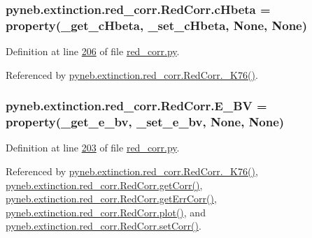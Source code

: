 \begin{DoxyVerb}
\subsubsection[{c\+Hbeta}]{\setlength{\rightskip}{0pt plus 5cm}pyneb.\+extinction.\+red\+\_\+corr.\+Red\+Corr.\+c\+Hbeta = property({\bf \+\_\+get\+\_\+c\+Hbeta}, {\bf \+\_\+set\+\_\+c\+Hbeta}, None, None)\hspace{0.3cm}{\ttfamily [static]}}\label{classpyneb_1_1extinction_1_1red__corr_1_1_red_corr_aaf16ae2a0bdb5dd620f9db382ffeebc9}


Definition at line \hyperlink{red__corr_8py_source_l00206}{206} of file \hyperlink{red__corr_8py_source}{red\+\_\+corr.\+py}.



Referenced by \hyperlink{red__corr_8py_source_l00595}{pyneb.\+extinction.\+red\+\_\+corr.\+Red\+Corr.\+\_\+\+K76()}.

\hypertarget{classpyneb_1_1extinction_1_1red__corr_1_1_red_corr_a0bc581bcaa8eeeb67b83ffdec58bf164}{}
\subsubsection[{E\+\_\+\+B\+V}]{\setlength{\rightskip}{0pt plus 5cm}pyneb.\+extinction.\+red\+\_\+corr.\+Red\+Corr.\+E\+\_\+\+B\+V = property({\bf \+\_\+get\+\_\+e\+\_\+bv}, {\bf \+\_\+set\+\_\+e\+\_\+bv}, None, None)\hspace{0.3cm}{\ttfamily [static]}}\label{classpyneb_1_1extinction_1_1red__corr_1_1_red_corr_a0bc581bcaa8eeeb67b83ffdec58bf164}


Definition at line \hyperlink{red__corr_8py_source_l00203}{203} of file \hyperlink{red__corr_8py_source}{red\+\_\+corr.\+py}.



Referenced by \hyperlink{red__corr_8py_source_l00595}{pyneb.\+extinction.\+red\+\_\+corr.\+Red\+Corr.\+\_\+\+K76()}, \hyperlink{red__corr_8py_source_l00211}{pyneb.\+extinction.\+red\+\_\+corr.\+Red\+Corr.\+get\+Corr()}, \hyperlink{red__corr_8py_source_l00251}{pyneb.\+extinction.\+red\+\_\+corr.\+Red\+Corr.\+get\+Err\+Corr()}, \hyperlink{red__corr_8py_source_l00303}{pyneb.\+extinction.\+red\+\_\+corr.\+Red\+Corr.\+plot()}, and \hyperlink{red__corr_8py_source_l00281}{pyneb.\+extinction.\+red\+\_\+corr.\+Red\+Corr.\+set\+Corr()}.


\end{DoxyVerb}
